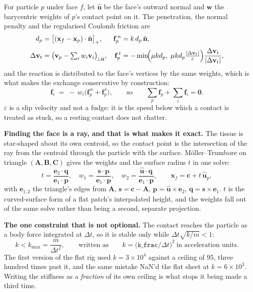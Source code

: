 \documentclass[10pt,a4paper]{article}
\newcommand{\code}[1]{\texttt{#1}}
\begin{document}
For particle $p$ under face $f$, let $\hat{\mathbf n}$ be the face's outward normal and $\mathbf w$ the
barycentric weights of $p$'s contact point on it. The penetration, the normal penalty and the
regularised Coulomb friction are
%
\begin{align}
d_p &= \bigl[(\mathbf x_f-\mathbf x_p)\cdot\hat{\mathbf n}\bigr]_+,
&\mathbf f^{\,n}_p &= k\,d_p\,\hat{\mathbf n},
\label{eq:pen}\\[2pt]
\Delta\mathbf v_t &= \bigl(\mathbf v_p-\textstyle\sum_i w_i\mathbf v_i\bigr)_{\!\perp\hat{\mathbf n}},
&\mathbf f^{\,t}_p &= -\min\!\Bigl(\mu k d_p,\;\mu k d_p\tfrac{|\Delta\mathbf v_t|}{\varepsilon}\Bigr)
\frac{\Delta\mathbf v_t}{|\Delta\mathbf v_t|},
\label{eq:fric}
\end{align}
%
and the reaction is distributed to the face's vertices by the same weights, which is what makes the
exchange conservative by construction:
%
\begin{equation}
\mathbf f_i \;=\; -\,w_i\bigl(\mathbf f^{\,n}_p+\mathbf f^{\,t}_p\bigr),
\qquad\text{so}\qquad
\sum_p\mathbf f_p+\sum_i\mathbf f_i=\mathbf 0 .
\label{eq:reaction}
\end{equation}
%
$\varepsilon$ is a slip velocity and not a fudge: it is the speed below which a contact is treated as
stuck, so a resting contact does not chatter.

\textbf{Finding the face is a ray, and that is what makes it exact.} The tissue is star-shaped about
its own centroid, so the contact point is the intersection of the ray from the centroid through the
particle with the surface. M\"oller--Trumbore on triangle $(\mathbf A,\mathbf B,\mathbf C)$ gives the
weights and the surface radius $t$ in one solve:
%
\begin{equation}
t=\frac{\mathbf e_2\!\cdot\!\mathbf q}{\mathbf e_1\!\cdot\!\mathbf p},\quad
w_1=\frac{\mathbf s\!\cdot\!\mathbf p}{\mathbf e_1\!\cdot\!\mathbf p},\quad
w_2=\frac{\hat{\mathbf u}\!\cdot\!\mathbf q}{\mathbf e_1\!\cdot\!\mathbf p},
\qquad
\mathbf x_f=\mathbf c+t\,\hat{\mathbf u}_p,
\label{eq:mt}
\end{equation}
%
with $\mathbf e_{1,2}$ the triangle's edges from $\mathbf A$, $\mathbf s=\mathbf c-\mathbf A$,
$\mathbf p=\hat{\mathbf u}\times\mathbf e_2$, $\mathbf q=\mathbf s\times\mathbf e_1$. $t$ is the
curved-surface form of a flat patch's interpolated height, and the weights fall out of the same solve
rather than being a second, separate projection.

\textbf{The one constraint that is not optional.} The contact reaches the particle as a body force
integrated at $\Delta t$, so it is stable only while $\Delta t\sqrt{k/m}<1$:
%
\begin{equation}
k<k_{\max}=\frac{m}{\Delta t^2},
\qquad\text{written as}\qquad
k=\bigl(\code{k\_frac}/\Delta t\bigr)^2\ \text{in acceleration units}.
\label{eq:cfl}
\end{equation}
%
The first version of the flat rig used $k=3\times10^4$ against a ceiling of $95$, three hundred times
past it, and the same mistake NaN'd the flat sheet at $k=6\times10^3$. Writing the stiffness as a
\emph{fraction} of its own ceiling is what stops it being made a third time.
\end{document}
